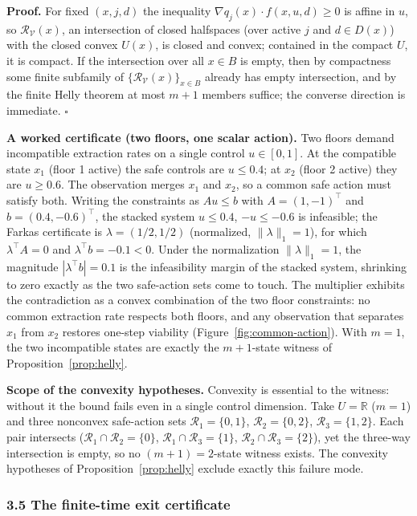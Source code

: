\documentclass[10pt,twocolumn]{article}
\theoremstyle{definition}
\begin{document}
\textbf{Proof.} For fixed \((x,j,d)\) the inequality
\(\nabla q_j(x)\cdot f(x,u,d)\ge 0\) is affine in \(u\), so
\(\mathcal R_{\mathcal V}(x)\), an intersection of closed halfspaces
(over active \(j\) and \(d\in D(x)\)) with the closed convex \(U(x)\),
is closed and convex; contained in the compact \(U\), it is compact. If
the intersection over all \(x\in B\) is empty, then by compactness some
finite subfamily of \(\{\mathcal R_{\mathcal V}(x)\}_{x\in B}\) already
has empty intersection, and by the finite Helly theorem at most \(m+1\)
members suffice; the converse direction is immediate. \hfill\(\square\)

\textbf{A worked certificate (two floors, one scalar action).} Two
floors demand incompatible extraction rates on a single control
\(u\in[0,1]\). At the compatible state \(x_1\) (floor 1 active) the safe
controls are \(u\le 0.4\); at \(x_2\) (floor 2 active) they are
\(u\ge 0.6\). The observation merges \(x_1\) and \(x_2\), so a common
safe action must satisfy both. Writing the constraints as \(Au\le b\)
with \(A=(1,-1)^{\top}\) and \(b=(0.4,-0.6)^{\top}\), the stacked system
\(u\le 0.4\), \(-u\le -0.6\) is infeasible; the Farkas certificate is
\(\lambda=(1/2,1/2)\) (normalized, \(\|\lambda\|_1=1\)), for which
\(\lambda^{\top}A=0\) and \(\lambda^{\top}b=-0.1<0\). Under the normalization
\(\|\lambda\|_1=1\), the magnitude \(|\lambda^{\top}b|=0.1\) is the
infeasibility margin of the stacked system, shrinking to zero exactly as
the two safe-action sets come to touch. The multiplier
exhibits the contradiction as a convex combination of the two floor
constraints: no common extraction rate respects both floors, and any
observation that separates \(x_1\) from \(x_2\) restores one-step
viability (Figure~\ref{fig:common-action}). With \(m=1\), the two
incompatible states are exactly the \(m+1\)-state witness of
Proposition~\ref{prop:helly}.

\textbf{Scope of the convexity hypotheses.} Convexity is essential to the witness: without it the bound fails even in a single control dimension. Take \(U=\mathbb R\) (\(m=1\)) and three nonconvex safe-action sets \(\mathcal R_1=\{0,1\}\), \(\mathcal R_2=\{0,2\}\), \(\mathcal R_3=\{1,2\}\). Each pair intersects (\(\mathcal R_1\cap\mathcal R_2=\{0\}\), \(\mathcal R_1\cap\mathcal R_3=\{1\}\), \(\mathcal R_2\cap\mathcal R_3=\{2\}\)), yet the three-way intersection is empty, so no \((m+1)=2\)-state witness exists. The convexity hypotheses of Proposition~\ref{prop:helly} exclude exactly this failure mode.

\subsubsection{3.5 The finite-time exit
certificate}\label{the-finite-time-exit-certificate}
\end{document}
